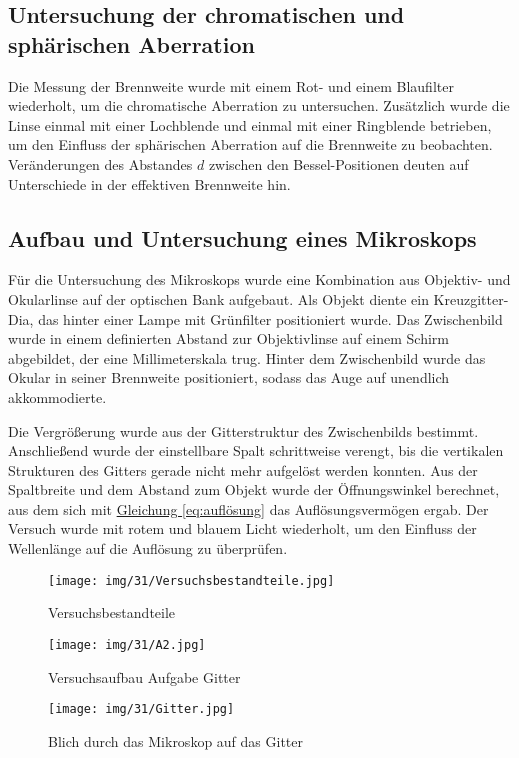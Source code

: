 \subsection{Untersuchung der chromatischen und sphärischen Aberration}

Die Messung der Brennweite wurde mit einem Rot- und einem Blaufilter wiederholt, um die chromatische Aberration zu untersuchen. Zusätzlich wurde die Linse einmal mit einer Lochblende und einmal mit einer Ringblende betrieben, um den Einfluss der sphärischen Aberration auf die Brennweite zu beobachten. Veränderungen des Abstandes $d$ zwischen den Bessel-Positionen deuten auf Unterschiede in der effektiven Brennweite hin.

\subsection{Aufbau und Untersuchung eines Mikroskops}

Für die Untersuchung des Mikroskops wurde eine Kombination aus Objektiv- und Okularlinse auf der optischen Bank aufgebaut. Als Objekt diente ein Kreuzgitter-Dia, das hinter einer Lampe mit Grünfilter positioniert wurde. Das Zwischenbild wurde in einem definierten Abstand zur Objektivlinse auf einem Schirm abgebildet, der eine Millimeterskala trug. Hinter dem Zwischenbild wurde das Okular in seiner Brennweite positioniert, sodass das Auge auf unendlich akkommodierte.

Die Vergrößerung wurde aus der Gitterstruktur des Zwischenbilds bestimmt. Anschließend wurde der einstellbare Spalt schrittweise verengt, bis die vertikalen Strukturen des Gitters gerade nicht mehr aufgelöst werden konnten. Aus der Spaltbreite und dem Abstand zum Objekt wurde der Öffnungswinkel berechnet, aus dem sich mit \hyperref[eq:auflösung]{Gleichung \ref*{eq:auflösung}} das Auflösungsvermögen ergab. Der Versuch wurde mit rotem und blauem Licht wiederholt, um den Einfluss der Wellenlänge auf die Auflösung zu überprüfen.

\begin{figure}[b!]
    \centering
    \texttt{[image: img/31/Versuchsbestandteile.jpg]}
    \caption{Versuchsbestandteile}
\end{figure}

\onecolumn
\begin{figure}
    \centering
    \texttt{[image: img/31/A2.jpg]}
    \caption{Versuchsaufbau Aufgabe Gitter}
\end{figure}

\begin{figure}
    \centering
    \texttt{[image: img/31/Gitter.jpg]}
    \caption{Blich durch das Mikroskop auf das Gitter}
\end{figure}

\twocolumn